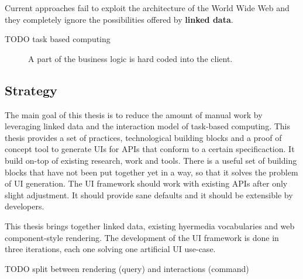 Current approaches fail to exploit the architecture of the World Wide Web and they completely ignore the possibilities offered by \textbf{linked data}.

TODO task based computing

\begin{figure}[!htb]
  \caption{\label{fig:my-label} A part of the business logic is hard coded into the client.}
\end{figure}


\subsection{Strategy}\label{strategy}
The main goal of this thesis is to reduce the amount of manual work by leveraging linked data and the interaction model of task-based computing.
This thesis provides a set of practices, technological building blocks and a proof of concept tool to generate UIs for APIs that conform to a certain specificaction. It build on-top of existing research, work and tools. There is a useful set of building blocks that have not been put together yet in a way, so that it solves the problem of UI generation. The UI framework should work with existing APIs after only slight adjustment. It should provide sane defaults and it should be extensible by developers.

This thesis brings together linked data, existing hyermedia vocabularies and web component-style rendering. The development of the UI framework is done in three iterations, each one solving one artificial UI use-case.

TODO split between rendering (query) and interactions (command)
